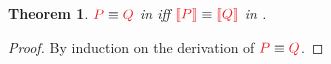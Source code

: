 \documentclass[draft,submission,copyright,creativecommons]{eptcs}
\newtheorem{theorem}{Theorem}
\begin{document}
\begin{theorem}\label{thm:cp2hcp-equiv}
  $\tm{P}\equiv\tm{Q}$ in \cp iff $\tm{\mtf{P}}\equiv\tm{\mtf{Q}}$ in \hcp.
\end{theorem}
\begin{proof}
  By induction on the derivation of $\tm{P}\equiv\tm{Q}$.
\end{proof}
\end{document}
